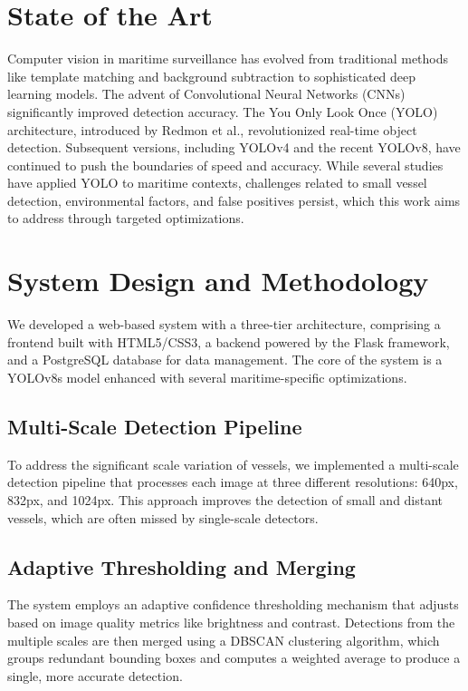 \documentclass[10pt]{article}
\begin{document}
\section{State of the Art}
Computer vision in maritime surveillance has evolved from traditional methods like template matching and background subtraction to sophisticated deep learning models. The advent of Convolutional Neural Networks (CNNs) significantly improved detection accuracy. The You Only Look Once (YOLO) architecture, introduced by Redmon et al., revolutionized real-time object detection\cite{redmon2016you}. Subsequent versions, including YOLOv4 and the recent YOLOv8, have continued to push the boundaries of speed and accuracy\cite{ultralytics2023yolov8}. While several studies have applied YOLO to maritime contexts, challenges related to small vessel detection, environmental factors, and false positives persist, which this work aims to address through targeted optimizations.

\section{System Design and Methodology}
We developed a web-based system with a three-tier architecture, comprising a frontend built with HTML5/CSS3, a backend powered by the Flask framework, and a PostgreSQL database for data management. The core of the system is a YOLOv8s model enhanced with several maritime-specific optimizations.

\subsection{Multi-Scale Detection Pipeline}
To address the significant scale variation of vessels, we implemented a multi-scale detection pipeline that processes each image at three different resolutions: 640px, 832px, and 1024px. This approach improves the detection of small and distant vessels, which are often missed by single-scale detectors.

\subsection{Adaptive Thresholding and Merging}
The system employs an adaptive confidence thresholding mechanism that adjusts based on image quality metrics like brightness and contrast. Detections from the multiple scales are then merged using a DBSCAN clustering algorithm, which groups redundant bounding boxes and computes a weighted average to produce a single, more accurate detection.
\end{document}
